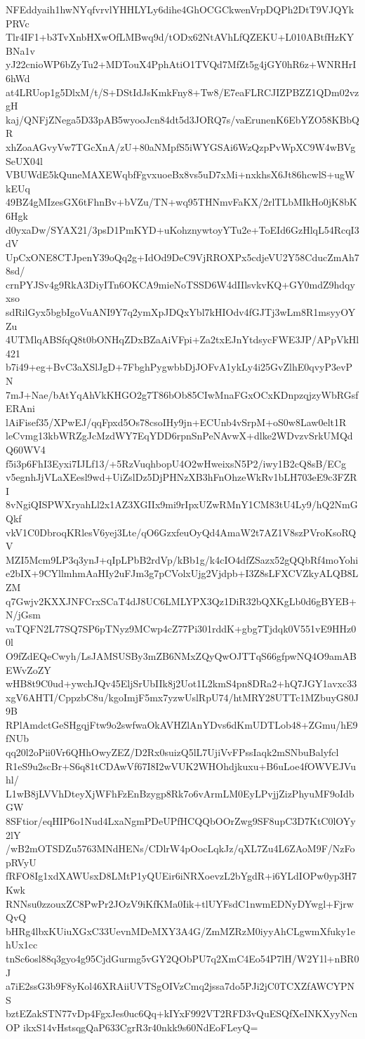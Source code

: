 NFEddyaih1hwNYqfvrvlYHHLYLy6dihe4GhOCGCkwenVrpDQPh2DtT9VJQYkPRVc
Tlr4IF1+b3TvXnbHXwOfLMBwq9d/tODx62NtAVhLfQZEKU+L010ABtfHzKYBNa1v
yJ22cnioWP6bZyTu2+MDTouX4PphAtiO1TVQd7MfZt5g4jGY0hR6z+WNRHrI6hWd
at4LRUop1g5DlxM/t/S+DStIdJsKmkFny8+Tw8/E7eaFLRCJIZPBZZ1QDm02vzgH
kaj/QNFjZNega5D33pAB5wyooJcn84dt5d3JORQ7s/vaErunenK6EbYZO58KBbQR
xhZoaAGvyVw7TGcXnA/zU+80aNMpfS5iWYGSAi6WzQzpPvWpXC9W4wBVgSeUX04l
VBUWdE5kQuneMAXEWqbfFgvxuoeBx8vs5uD7xMi+nxkhsX6Jt86hcwlS+ugWkEUq
49BZ4gMIzesGX6tFhnBv+bVZu/TN+wq95THNmvFaKX/2rlTLbMIkHo0jK8bK6Hgk
d0yxaDw/SYAX21/3psD1PmKYD+uKohznywtoyYTu2e+ToEId6GzHlqL54RcqI3dV
UpCxONE8CTJpenY39oQq2g+IdOd9DeC9VjRROXPx5cdjeVU2Y58CducZmAh78sd/
crnPYJSv4g9RkA3DiyITn6OKCA9mieNoTSSD6W4dIIlsvkvKQ+GY0mdZ9hdqyxso
sdRilGyx5bgbIgoVuANI9Y7q2ymXpJDQxYbl7kHIOdv4fGJTj3wLm8R1msyyOYZu
4UTMlqABSfqQ8t0bONHqZDxBZaAiVFpi+Za2txEJnYtdsycFWE3JP/APpVkHl421
b7i49+eg+BvC3aXSlJgD+7FbghPygwbbDjJOFvA1ykLy4i25GvZlhE0qvyP3evPN
7mJ+Nae/bAtYqAhVkKHGO2g7T86bOb85CIwMnaFGxOCxKDnpzqjzyWbRGsfERAni
lAiFisef35/XPwEJ/qqFpxd5Os78csoIHy9jn+ECUnb4vSrpM+oS0w8Law0elt1R
leCvmg13kbWRZgJcMzdWY7EqYDD6rpnSnPeNAvwX+dlke2WDvzvSrkUMQdQ60WV4
f5i3p6FhI3Eyxi7IJLf13/+5RzVuqhbopU4O2wHweixsN5P2/iwy1B2cQ8sB/ECg
v5egnhJjVLaXEesl9wd+UiZslDz5DjPHNzXB3hFnOhzeWkRv1bLH703eE9c3FZRI
8vNgiQISPWXryahLl2x1AZ3XGIIx9mi9rIpxUZwRMnY1CM83tU4Ly9/hQ2NmGQkf
vkV1C0DbroqKRlesV6yej3Lte/qO6GzxfeuOyQd4AmaW2t7AZ1V8szPVroKsoRQV
MZI5Mcm9LP3q3ynJ+qIpLPbB2rdVp/kBb1g/k4cIO4dfZSazx52gQQbRf4moYohi
e2bIX+9CYllmhmAaHIy2uFJm3g7pCVolxUjg2Vjdpb+I3Z8sLFXCVZkyALQB8LZM
q7Gwjv2KXXJNFCrxSCaT4dJ8UC6LMLYPX3Qz1DiR32bQXKgLb0d6gBYEB+N/jGsm
vaTQFN2L77SQ7SP6pTNyz9MCwp4cZ77Pi301rddK+gbg7Tjdqk0V551vE9HHz00l
O9fZdEQeCwyh/LsJAMSUSBy3mZB6NMxZQyQwOJTTqS66gfpwNQ4O9amABEWvZoZY
wHB8t9C0ud+ywchJQv45EljSrUbIIk8j2Uot1L2kmS4pn8DRa2+hQ7JGY1avxc33
xgV6AHTI/CppzbC8u/kgoImjF5mx7yzwUslRpU74/htMRY28UTTc1MZbuyG80J9B
RPlAmdctGeSHgqjFtw9o2swfwaOkAVHZlAnYDvs6dKmUDTLob48+ZGmu/hE9fNUb
qq20l2oPii0Vr6QHhOwyZEZ/D2Rx0suizQ5lL7UjiVvFPssIaqk2mSNbuBalyfcl
R1eS9u2scBr+S6q81tCDAwVf67I8I2wVUK2WHOhdjkuxu+B6uLoe4fOWVEJVuhl/
L1wB8jLVVhDteyXjWFhFzEnBzygp8Rk7o6vArmLM0EyLPvjjZizPhyuMF9oIdbGW
8SFtior/eqHIP6o1Nud4LxaNgmPDeUPfHCQQbOOrZwg9SF8upC3D7KtC0lOYy2lY
/wB2mOTSDZu5763MNdHENs/CDlrW4pOocLqkJz/qXL7Zu4L6ZAoM9F/NzFopRVyU
fRFO8Ig1xdXAWUsxD8LMtP1yQUEir6iNRXoevzL2bYgdR+i6YLdIOPw0yp3H7Kwk
RNNsu0zzouxZC8PwPr2JOzV9iKfKMa0Iik+tlUYFsdC1nwmEDNyDYwgl+FjrwQvQ
bHRg4lbxKUiuXGxC33UevnMDeMXY3A4G/ZmMZRzM0iyyAhCLgwmXfuky1ehUx1cc
tnSc6osl88q3gyo4g95CjdGurmg5vGY2QObPU7q2XmC4Eo54P7lH/W2Y1l+nBR0J
a7iE2ssG3b9F8yKol46XRAiiUVTSgOIVzCmq2jssa7do5PJi2jC0TCXZfAWCYPNS
bztEZakSTN77vDp4FgxJes0uc6Qq+kIYxF992VT2RFD3vQuESQfXeINKXyyNcnOP
ikxS14vHstsqgQaP633CgrR3r40nkk9s60NdEoFLeyQ=
